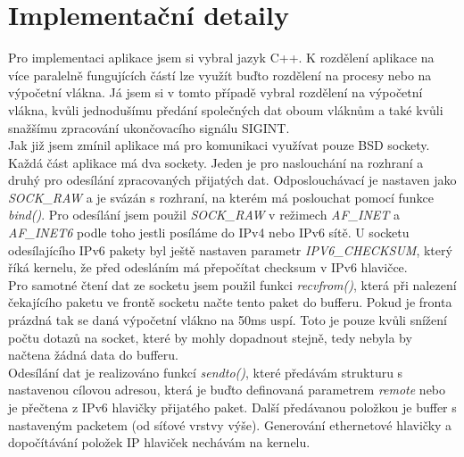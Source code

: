 \documentclass[12pt,a4paper,onecolumn]{article}
\begin{document}
\section{Implementační detaily}
Pro implementaci aplikace jsem si vybral jazyk C++. K rozdělení aplikace na více paralelně
fungujících částí lze využít buďto rozdělení na procesy nebo na výpočetní vlákna. Já jsem si v
tomto případě vybral rozdělení na výpočetní vlákna, kvůli jednodušímu předání společných dat oboum
vláknům a také kvůli snažšímu zpracování ukončovacího signálu SIGINT.\\
\indent Jak již jsem zmínil aplikace má pro komunikaci využívat pouze BSD sockety. Každá část
aplikace má dva sockety. Jeden je pro naslouchání na rozhraní a druhý pro odesílání zpracovaných
přijatých dat. Odposlouchávací je nastaven jako {\it SOCK\_RAW}  a je svázán s rozhraní, na kterém má poslouchat pomocí funkce {\it bind()}. Pro
odesílání jsem použil {\it SOCK\_RAW} v režimech {\it AF\_INET} a {\it AF\_INET6} podle toho
jestli posíláme do IPv4 nebo IPv6 sítě. U socketu odesílajícího IPv6 pakety byl ještě nastaven
parametr {\it IPV6\_CHECKSUM}, který říká kernelu, že před odesláním má přepočítat checksum v IPv6
hlavičce.\\
\indent Pro samotné čtení dat ze socketu jsem použil funkci {\it recvfrom()}, která při
nalezení čekajícího paketu ve frontě socketu načte tento paket do bufferu. Pokud je fronta prázdná
tak se daná výpočetní vlákno na 50ms uspí. Toto je pouze kvůli snížení počtu dotazů na socket,
které by mohly dopadnout stejně, tedy nebyla by načtena žádná data do bufferu.\\
\indent Odesílání dat je realizováno funkcí {\it sendto()}, které předávám strukturu s nastavenou
cílovou adresou, která je buďto definovaná parametrem {\it remote} nebo je přečtena z IPv6 hlavičky
přijatého paket. Další předávanou položkou je buffer s nastaveným packetem (od síťové vrstvy výše).
Generování ethernetové hlavičky a dopočítávání položek IP hlaviček nechávám na kernelu.
\end{document}
